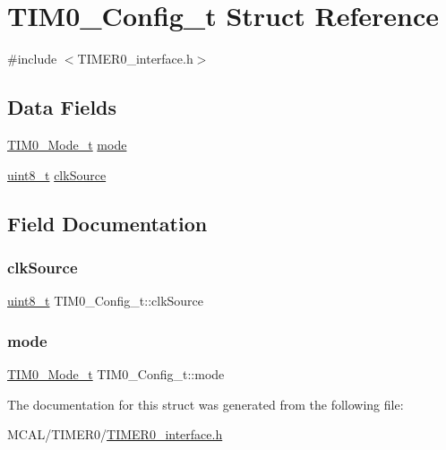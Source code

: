\hypertarget{struct_t_i_m0___config__t}{}\section{T\+I\+M0\+\_\+\+Config\+\_\+t Struct Reference}
\label{struct_t_i_m0___config__t}


{\ttfamily \#include $<$T\+I\+M\+E\+R0\+\_\+interface.\+h$>$}

\subsection*{Data Fields}
\begin{DoxyCompactItemize}
\item 
\hyperlink{_t_i_m_e_r0__interface_8h_a6746d7ff1ce7e1f528b1f19a96221e30}{T\+I\+M0\+\_\+\+Mode\+\_\+t} \hyperlink{struct_t_i_m0___config__t_ab1c32336a020d75f4e684eb265b0824d}{mode}
\item 
\hyperlink{_typedef_8h_aba7bc1797add20fe3efdf37ced1182c5}{uint8\+\_\+t} \hyperlink{struct_t_i_m0___config__t_a80e52cf145be56ef34899d8a12a21cc9}{clk\+Source}
\end{DoxyCompactItemize}


\subsection{Field Documentation}
\mbox{\label{struct_t_i_m0___config__t_a80e52cf145be56ef34899d8a12a21cc9}} 
\subsubsection{\texorpdfstring{clk\+Source}{clkSource}}
{\footnotesize\ttfamily \hyperlink{_typedef_8h_aba7bc1797add20fe3efdf37ced1182c5}{uint8\+\_\+t} T\+I\+M0\+\_\+\+Config\+\_\+t\+::clk\+Source}

\mbox{\label{struct_t_i_m0___config__t_ab1c32336a020d75f4e684eb265b0824d}} 
\subsubsection{\texorpdfstring{mode}{mode}}
{\footnotesize\ttfamily \hyperlink{_t_i_m_e_r0__interface_8h_a6746d7ff1ce7e1f528b1f19a96221e30}{T\+I\+M0\+\_\+\+Mode\+\_\+t} T\+I\+M0\+\_\+\+Config\+\_\+t\+::mode}



The documentation for this struct was generated from the following file\+:\begin{DoxyCompactItemize}
\item 
M\+C\+A\+L/\+T\+I\+M\+E\+R0/\hyperlink{_t_i_m_e_r0__interface_8h}{T\+I\+M\+E\+R0\+\_\+interface.\+h}\end{DoxyCompactItemize}
